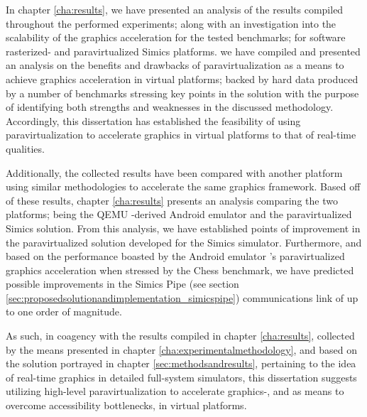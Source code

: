In chapter \ref{cha:results}, we have presented an analysis of the results compiled throughout the performed experiments; along with an investigation into the scalability of the graphics acceleration for the tested benchmarks; for software rasterized- and paravirtualized Simics platforms.
we have compiled and presented an analysis on the benefits and drawbacks of paravirtualization as a means to achieve graphics acceleration in virtual platforms; backed by hard data produced by a number of benchmarks stressing key points in the solution with the purpose of identifying both strengths and weaknesses in the discussed methodology.
Accordingly, this dissertation has established the feasibility of using paravirtualization to accelerate graphics in virtual platforms to that of real-time qualities.

Additionally, the collected results have been compared with another platform using similar methodologies to accelerate the same graphics framework.
Based off of these results, chapter \ref{cha:results} presents an analysis comparing the two platforms; being the QEMU -derived Android emulator and the paravirtualized Simics solution.
From this analysis, we have established points of improvement in the paravirtualized solution developed for the Simics simulator.
Furthermore, and based on the performance boasted by the Android emulator 's paravirtualized graphics acceleration when stressed by the Chess benchmark, we have predicted possible improvements in the Simics Pipe (see section \ref{sec:proposedsolutionandimplementation_simicspipe}) communications link of up to one order of magnitude.

As such, in coagency with the results compiled in chapter \ref{cha:results}, collected by the means presented in chapter \ref{cha:experimentalmethodology}, and based on the solution portrayed in chapter \ref{sec:methodsandresults}, pertaining to the idea of real-time graphics in detailed full-system simulators, this dissertation suggests utilizing high-level paravirtualization to accelerate graphics-, and as means to overcome accessibility bottlenecks, in virtual platforms.
